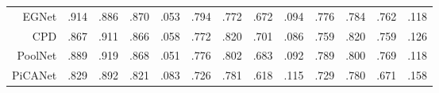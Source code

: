 \begin{table}[p]
{\begin{tabular}{rcccccccccccc}
			
			EGNet   \upcite{zhao2019egnet}
			& .914 & .886 & .870 & .053 
			& .794 & .772 & .672 & .094 
			& .776 & .784 & .762 & .118 
			\\ 
			
			CPD  \upcite{wu2019cascaded}
			& .867 & .911 & .866 & .058 
			& .772 & .820 & .701 & .086 
			& .759 & .820 & .759 & .126 \\
			
			PoolNet \upcite{liu2019simple}
			& .889 & .919 & .868 & .051 
			& .776 & .802 & .683 & .092 
			& .789 & .800 & .769 & .118 \\
			
			PiCANet \upcite{liu2018picanet}
			& .829 & .892 & .821 & .083 
			& .726 & .781 & .618 & .115 
			& .729 & .780 & .671 & .158 \\
			
			
			\bottomrule[1.5pt] %
		\end{tabular}
	}
\end{table}
%
%




